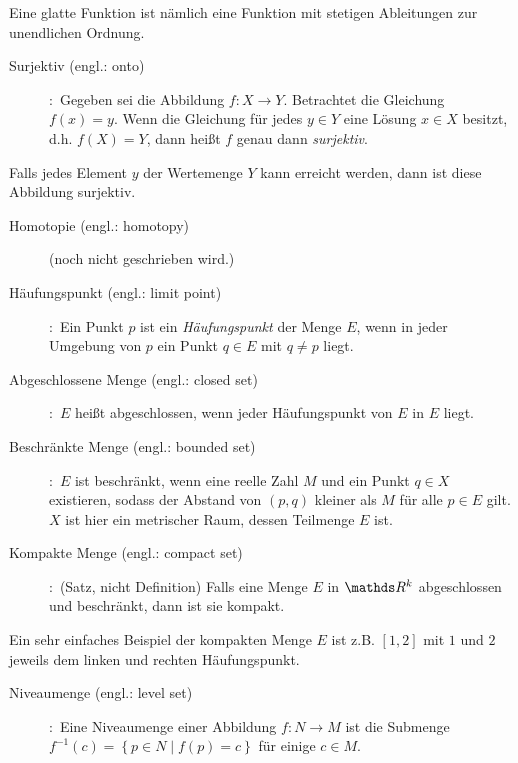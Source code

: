 \vspace{-0.8em}
Eine glatte Funktion ist nämlich eine Funktion mit stetigen Ableitungen zur unendlichen Ordnung.
\begin{description}
\item[Surjektiv (engl.: onto)]
\cite[S.931]{grosche2003teubner}:~Gegeben sei die Abbildung $f:X \to Y$. Betrachtet die Gleichung $f\left ( x \right )=y$. Wenn die Gleichung für jedes $y\in Y$ eine Lösung $x\in X$ besitzt, d.h. $f\left ( X \right )=Y$, dann heißt $f$ genau dann \emph{surjektiv}.
\end{description}
\vspace{-0.8em}
Falls jedes Element $y$ der Wertemenge $Y$ kann erreicht werden, dann ist diese Abbildung surjektiv. 
\begin{description}
\item[Homotopie (engl.: homotopy)]
\cite[]{}(noch nicht geschrieben wird.)
\end{description}
\vspace{-0.8em}
\begin{description}
\item[Häufungspunkt (engl.: limit point)]
\cite[S.35]{rudin2009analysis}:~Ein Punkt $p$ ist ein \emph{Häufungspunkt} der Menge $E$, wenn in jeder Umgebung von $p$ ein Punkt $q\in E$ mit $q\neq p$ liegt.
\item[Abgeschlossene Menge (engl.: closed set)]
\cite[S.36]{rudin2009analysis}:~$E$ heißt abgeschlossen, wenn jeder Häufungspunkt von $E$ in $E$ liegt.
\item[Beschränkte Menge (engl.: bounded set)]
\cite[S.36]{rudin2009analysis}:~$E$ ist beschränkt, wenn eine reelle Zahl $M$ und ein Punkt $q\in X$ existieren, sodass der Abstand von $(p,q)$ kleiner als $M$ für alle $p\in E$ gilt. $X$ ist hier ein metrischer Raum, dessen Teilmenge $E$ ist.
\item[Kompakte Menge (engl.: compact set)]
\cite[S.45]{rudin2009analysis}:~(Satz, nicht Definition) Falls eine Menge $E$ in $\Reals^{k}$ abgeschlossen und beschränkt, dann ist sie kompakt.
\end{description}
\vspace{-0.8em}
Ein sehr einfaches Beispiel der kompakten Menge $E$ ist z.B. $\left [ 1,2 \right ]$ mit $1$ und $2$ jeweils dem linken und rechten Häufungspunkt. %
\begin{description}
\item[Niveaumenge (engl.: level set)]
\cite[S.94]{tu2010introduction}:~Eine Niveaumenge einer Abbildung $f:N \to M$ ist die Submenge $f^{-1}\left ( c \right )= \left \{ p\in N \mid f\left ( p \right )= c\right \}$ für einige $c\in M$.
\end{description}
